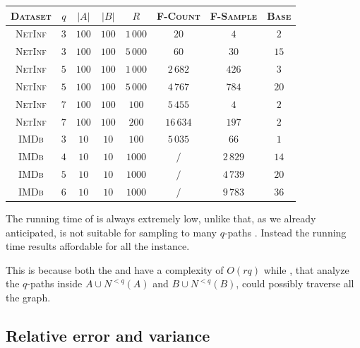 \begin{table}[h]
	\centering
	\begin{tabular}{|c|c|c|c|c|c|c|c|}
		\hline
		\textsc{Dataset} & $q$ & $|A|$ & $|B|$ & $R$      & \textsc{F-Count} & \textsc{F-Sample} & \textsc{Base} \\ \hline \hline
		\textsc{NetInf}  & $3$ & $100$ & $100$ & $1\,000$ & $20$             & $4$               & $2$           \\ \hline
		\textsc{NetInf}  & $3$ & $100$ & $100$ & $5\,000$ & $60$             & $30$              & $15$          \\ \hline
		\textsc{NetInf}  & $5$ & $100$ & $100$ & $1\,000$ & $2\,682$         & $426$             & $3$           \\ \hline
		\textsc{NetInf}  & $5$ & $100$ & $100$ & $5\,000$ & $4\,767$         & $784$             & $20$          \\ \hline
		\textsc{NetInf}  & $7$ & $100$ & $100$ & $100$    & $5\,455$         & $4$               & $2$           \\ \hline
		\textsc{NetInf}  & $7$ & $100$ & $100$ & $200$    & $16\,634$        & $197$             & $2$           \\ \hline \hline
		\textsc{IMDb}    & $3$ & $10$  & $10$  & $100$    & $5\,035$         & $66$              & $1$           \\ \hline
		\textsc{IMDb}    & $4$ & $10$  & $10$  & $1000$   & $/$              & $2\,829$          & $14$          \\ \hline
		\textsc{IMDb}    & $5$ & $10$  & $10$  & $1000$   & $/$              & $4\,739$          & $20$          \\ \hline
		\textsc{IMDb}    & $6$ & $10$  & $10$  & $1000$   & $/$              & $9\,783$          & $36$          \\ \hline
	\end{tabular}
\end{table}

The running time of \base is always extremely low, 
unlike \fcount that, as we already anticipated, is not suitable for sampling to many $q$-paths .
Instead the running time \fsamp results affordable for all the instance. 

This is because both the \fsamp and \base have a complexity of $O(rq)$ while 
\fcount, that analyze the $q$-paths inside $A \cup N^{<q}(A)$ and $B \cup N^{<q}(B)$, could possibly traverse all the graph.

\subsection*{Relative error and variance}


